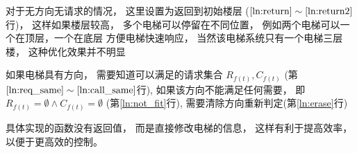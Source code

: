 \documentclass[../main.tex]{subfiles} %
\begin{document}
对于无方向无请求的情况，
这里设置为返回到初始楼层
($\ref{ln:return} \sim \ref{ln:return2}$行)，
这样如果楼层较高，
多个电梯可以停留在不同位置，
例如两个电梯可以一个在顶层，一个在底层
方便电梯快速响应，
当然该电梯系统只有一个电梯三层楼，
这种优化效果并不明显

如果电梯具有方向，
需要知道可以满足的请求集合
$R_{f(t)},C_{f(t)}$
(第$\ref{ln:req_same} \sim \ref{ln:call_same}$行),
如果该方向不能满足任何需要，
即
$R_{f(t)} = \emptyset \land C_{f(t)} = \emptyset$
(第\ref{ln:not_fit}行),
需要清除方向重新判定(第\ref{ln:erase}行)


具体实现的函数没有返回值，
而是直接修改电梯的信息，
这样有利于提高效率，
以便于更高效的控制。
\end{document}
